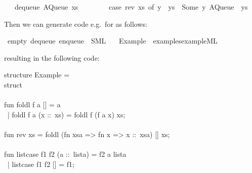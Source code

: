 \begin{isabellebody}
\ \ {\isacharbar}\ {\isachardoublequoteopen}dequeue\ {\isacharparenleft}AQueue\ xs\ {\isacharbrackleft}{\isacharbrackright}{\isacharparenright}\ {\isacharequal}\isanewline
\ \ \ \ \ \ {\isacharparenleft}case\ rev\ xs\ of\ y\ {\isacharhash}\ ys\ {\isasymRightarrow}\ {\isacharparenleft}Some\ y{\isacharcomma}\ AQueue\ {\isacharbrackleft}{\isacharbrackright}\ ys{\isacharparenright}{\isacharparenright}{\isachardoublequoteclose}%
\endisatagquote
{\isafoldquote}%
%
\isadelimquote
%
\endisadelimquote
%
\begin{isamarkuptext}%
\noindent Then we can generate code e.g.~for  as follows:%
\end{isamarkuptext}%
\isamarkuptrue%
%
\isadelimquote
%
\endisadelimquote
%
\isatagquote
{}\isamarkupfalse%
\ empty\ dequeue\ enqueue\ \ SML\isanewline
\ \ \ Example\ \ {\isachardoublequoteopen}examples{\isacharslash}example{\isachardot}ML{\isachardoublequoteclose}%
\endisatagquote
{\isafoldquote}%
%
\isadelimquote
%
\endisadelimquote
%
\begin{isamarkuptext}%
\noindent resulting in the following code:%
\end{isamarkuptext}%
\isamarkuptrue%
%
\isadelimquote
%
\endisadelimquote
%
\isatagquote
%
\begin{isamarkuptext}%
\isatypewriter%
\noindent%
\hspace*{0pt}structure Example = \\
\hspace*{0pt}struct\\
\hspace*{0pt}\\
\hspace*{0pt}fun foldl f a [] = a\\
\hspace*{0pt} ~| foldl f a (x ::~xs) = foldl f (f a x) xs;\\
\hspace*{0pt}\\
\hspace*{0pt}fun rev xs = foldl (fn xsa => fn x => x ::~xsa) [] xs;\\
\hspace*{0pt}\\
\hspace*{0pt}fun list{}case f1 f2 (a ::~lista) = f2 a lista\\
\hspace*{0pt} ~| list{}case f1 f2 [] = f1;\\

\end{isamarkuptext}
\end{isabellebody}
